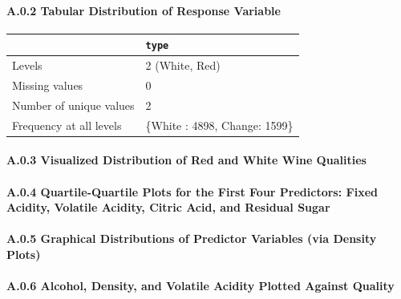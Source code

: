\documentclass[
  letterpaper,
  DIV=11,
  numbers=noendperiod]{scrartcl}
\let\oldparagraph\paragraph
\renewcommand{\paragraph}[1]{\oldparagraph{#1}\mbox{}}
\begin{document}
\hypertarget{a.0.2-tabular-distribution-of-response-variable}{%
\paragraph{A.0.2 Tabular Distribution of Response
Variable}\label{a.0.2-tabular-distribution-of-response-variable}}

\begin{longtable}[]{@{}ll@{}}
\toprule()
& \texttt{type} \\
\midrule()
\endhead
Levels & 2 (White, Red) \\
Missing values & 0 \\
Number of unique values & 2 \\
Frequency at all levels & \{White : 4898, Change: 1599\} \\
\bottomrule()
\end{longtable}

\hypertarget{a.0.3-visualized-distribution-of-red-and-white-wine-qualities}{%
\paragraph{A.0.3 Visualized Distribution of Red and White Wine
Qualities}\label{a.0.3-visualized-distribution-of-red-and-white-wine-qualities}}

\hypertarget{a.0.4-quartile-quartile-plots-for-the-first-four-predictors-fixed-acidity-volatile-acidity-citric-acid-and-residual-sugar}{%
\paragraph{A.0.4 Quartile-Quartile Plots for the First Four Predictors:
Fixed Acidity, Volatile Acidity, Citric Acid, and Residual
Sugar}\label{a.0.4-quartile-quartile-plots-for-the-first-four-predictors-fixed-acidity-volatile-acidity-citric-acid-and-residual-sugar}}

\hypertarget{a.0.5-graphical-distributions-of-predictor-variables-via-density-plots}{%
\paragraph{A.0.5 Graphical Distributions of Predictor Variables (via
Density
Plots)}\label{a.0.5-graphical-distributions-of-predictor-variables-via-density-plots}}

\hypertarget{a.0.6-alcohol-density-and-volatile-acidity-plotted-against-quality}{%
\paragraph{A.0.6 Alcohol, Density, and Volatile Acidity Plotted Against
Quality}\label{a.0.6-alcohol-density-and-volatile-acidity-plotted-against-quality}}
\end{document}

